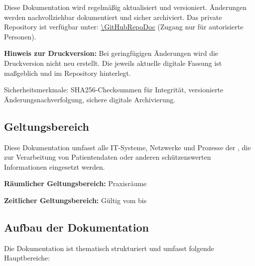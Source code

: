 Diese Dokumentation wird regelmäßig aktualisiert und versioniert. Änderungen werden
nachvollziehbar dokumentiert und sicher archiviert. Das private Repository ist verfügbar
unter: \url{\GitHubRepoDoc} (Zugang nur für autorisierte Personen).

\textbf{Hinweis zur Druckversion:} Bei geringfügigen Änderungen wird die Druckversion
nicht neu erstellt. Die jeweils aktuelle digitale Fassung ist maßgeblich und im
Repository hinterlegt.

Sicherheitsmerkmale: SHA256-Checksummen für Integrität, versionierte
Änderungsnachverfolgung, sichere digitale Archivierung.

\subsection{Geltungsbereich}

Diese Dokumentation umfasst alle IT-Systeme, Netzwerke und Prozesse der
\PraxisName, die zur Verarbeitung von Patientendaten oder anderen
schützenswerten Informationen eingesetzt werden.

\textbf{Räumlicher Geltungsbereich:} Praxisräume \PraxisVollAdresse

\textbf{Zeitlicher Geltungsbereich:} Gültig vom \DocumentDate{} bis \ValidUntil

\subsection{Aufbau der Dokumentation}

Die Dokumentation ist thematisch strukturiert und umfasst folgende Hauptbereiche:

